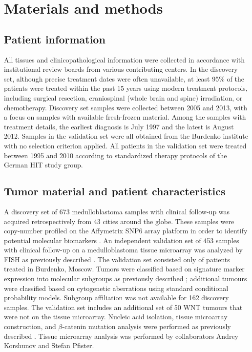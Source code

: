 \clearpage

\section{Materials and methods}

\subsection{Patient information}

All tissues and clinicopathological information were collected in accordance with institutional review boards from various contributing centers. In the discovery set, although precise treatment dates were often unavailable, at least 95\% of the patients were treated within the past 15 years using modern treatment protocols, including surgical resection, craniospinal (whole brain and spine) irradiation, or chemotherapy. Discovery set samples were collected between 2005 and 2013, with a focus on samples with available fresh-frozen material. Among the samples with treatment details, the earliest diagnosis is July 1997 and the latest is August 2012. Samples in the validation set were all obtained from the Burdenko institute with no selection criterion applied. All patients in the validation set were treated between 1995 and 2010 according to standardized therapy protocols of the German HIT study group.

\subsection{Tumor material and patient characteristics}

A discovery set of 673 medulloblastoma samples with clinical follow-up was acquired retrospectively from 43 cities around the globe. These samples were copy-number profiled on the Affymetrix SNP6 array platform in order to identify potential molecular biomarkers . An independent validation set of 453 samples with clinical follow-up on a medulloblastoma tissue microarray was analyzed by FISH as previously described . The validation set consisted only of patients treated in Burdenko, Moscow. Tumors were classified based on signature marker expression into molecular subgroups as previously described ; additional tumours were classified based on cytogenetic aberrations using standard conditional probability models. Subgroup affiliation was not available for 162 discovery samples. The validation set includes an additional set of 50 WNT tumours that were not on the tissue microarray. Nucleic acid isolation, tissue microarray construction, and $\beta$-catenin mutation analysis were performed as previously described . Tissue microarray analysis was performed by collaborators Andrey Korshunov and Stefan Pfister.


